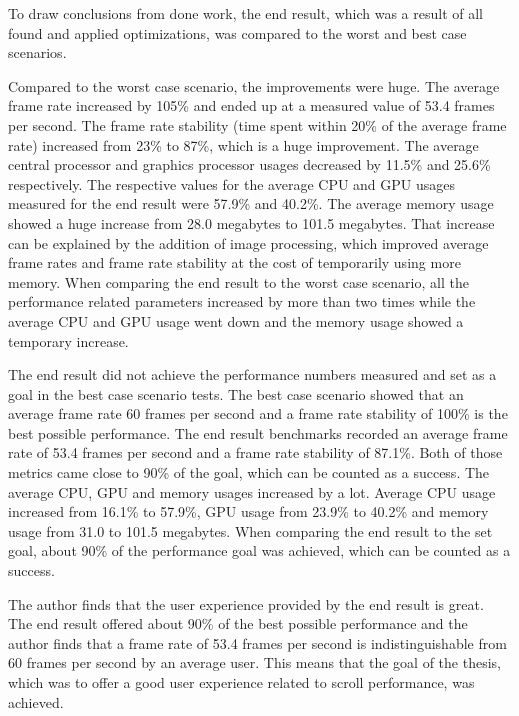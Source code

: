 \documentclass[a4paper,12pt]{article}
\begin{document}
To draw conclusions from done work, the end result, which was a result of all found and applied optimizations, was compared to the worst and best case scenarios.

Compared to the worst case scenario, the improvements were huge. The average frame rate increased by 105\% and ended up at a measured value of 53.4 frames per second. The frame rate stability (time spent within 20\% of the average frame rate) increased from 23\% to 87\%, which is a huge improvement. The average central processor and graphics processor usages decreased by 11.5\% and 25.6\% respectively. The respective values for the average CPU and GPU usages measured for the end result were 57.9\% and 40.2\%. The average memory usage showed a huge increase from 28.0 megabytes to 101.5 megabytes. That increase can be explained by the addition of image processing, which improved average frame rates and frame rate stability at the cost of temporarily using more memory. When comparing the end result to the worst case scenario, all the performance related parameters increased by more than two times while the average CPU and GPU usage went down and the memory usage showed a temporary increase.

The end result did not achieve the performance numbers measured and set as a goal in the best case scenario tests. The best case scenario showed that an average frame rate 60 frames per second and a frame rate stability of 100\% is the best possible performance. The end result benchmarks recorded an average frame rate of 53.4 frames per second and a frame rate stability of 87.1\%. Both of those metrics came close to 90\% of the goal, which can be counted as a success. The average CPU, GPU and memory usages increased by a lot. Average CPU usage increased from 16.1\% to 57.9\%, GPU usage from 23.9\% to 40.2\% and memory usage from 31.0 to 101.5 megabytes. When comparing the end result to the set goal, about 90\% of the performance goal was achieved, which can be counted as a success.

The author finds that the user experience provided by the end result is great. The end result offered about 90\% of the best possible performance and the author finds that a frame rate of 53.4 frames per second is indistinguishable from 60 frames per second by an average user. This means that the goal of the thesis, which was to offer a good user experience related to scroll performance, was achieved.


\newpage
{}
{}
\listoffigures

\newpage
{}
{}


\end{document}
